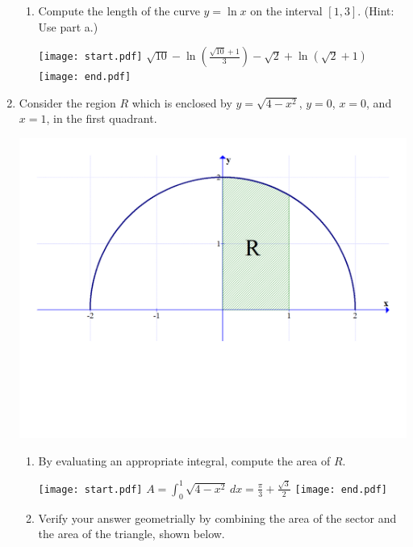 \documentclass[12pt]{article}
\begin{document}
\begin{enumerate}
\begin{enumerate}
\item Compute the length of the curve $y=\ln{x}$ on the interval $[1,3]$.  (Hint: Use part a.)

\texttt{[image: start.pdf]}
{{$\sqrt{10}-\ln{\left(\frac{\sqrt{10}+1}{3}\right)}-\sqrt{2}+\ln{\left(\sqrt{2}+1\right)}$}}
\texttt{[image: end.pdf]}


\end{enumerate}

\item Consider the region $R$ which is enclosed by $y=\sqrt{4-x^2}$, $y=0$, $x=0$, and $x=1$, in the first quadrant.

\begin{center}
\includegraphics[scale=0.4]{area.pdf}
\end{center}

\begin{enumerate}

\item By evaluating an appropriate integral, compute the area of $R$.

\texttt{[image: start.pdf]}
{{$A=\int_0^1 \sqrt{4-x^2} \,dx=\frac{\pi}{3}+\frac{\sqrt{3}}{2}$}}
\texttt{[image: end.pdf]}


\item Verify your answer geometrially by combining the area of the sector and the area of the triangle, shown below.


\end{enumerate}
\end{enumerate}
\end{document}
